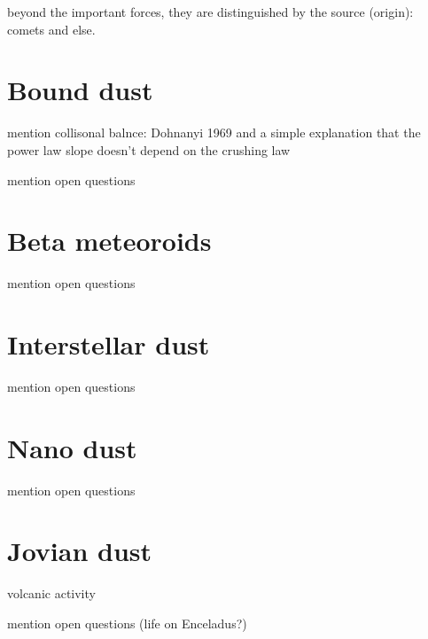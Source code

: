 beyond the important forces, they are distinguished by the source (origin): comets and else.

\section{Bound dust}

mention collisonal balnce:  Dohnanyi 1969 and a simple explanation that the power law slope doesn't depend on the crushing law

mention open questions

\section{Beta meteoroids}

mention open questions

\section{Interstellar dust}

mention open questions

\section{Nano dust}

mention open questions

\section{Jovian dust}

volcanic activity

mention open questions (life on Enceladus?)

